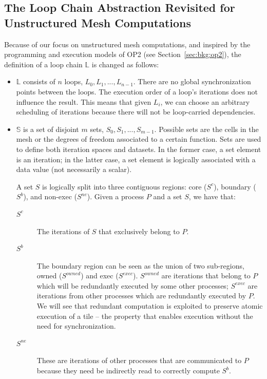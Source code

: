 \subsection{The Loop Chain Abstraction Revisited for Unstructured Mesh Computations}
\label{sec:tiling:lc-unstruct}
Because of our focus on unstructured mesh computations, and inspired by the programming and execution models of OP2 (see Section~\ref{sec:bkg:op2}), the definition of a loop chain $\mathbb{L}$ is changed as follows:
\begin{itemize}
\item $\mathbb{L}$ consists of $n$ loops, $L_0, L_1, ..., L_{n-1}$. There are no global synchronization points between the loops. The execution order of a loop's iterations does not influence the result. This means that given $L_i$, we can choose an arbitrary scheduling of iterations because there will not be loop-carried dependencies. 

\item $\mathbb{S}$ is a set of disjoint $m$ sets, $S_0, S_1, ..., S_{m-1}$. Possible sets are the cells in the mesh or the degrees of freedom associated to a certain function. Sets are used to define both iteration spaces and datasets. In the former case, a set element is an iteration; in the latter case, a set element is logically associated with a data value (not necessarily a scalar). 

A set $S$ is logically split into three contiguous regions: core ($S^{c}$), boundary ($S^{b}$), and non-exec ($S^{ne}$). Given a process $P$ and a set $S$, we have that:
\begin{description}
 \item[$S^{c}$] The iterations of $S$ that exclusively belong to $P$.
 \item[$S^{b}$] The boundary region can be seen as the union of two sub-regions, owned ($S^{owned}$) and exec ($S^{exec}$). $S^{owned}$ are iterations that belong to $P$ which will be redundantly executed by some other processes; $S^{exec}$ are iterations from other processes which are redundantly executed by $P$. We will see that redundant computation is exploited to preserve atomic execution of a tile -- the property that enables execution without the need for synchronization.
  \item[$S^{ne}$] These are iterations of other processes that are communicated to $P$ because they need be indirectly read to correctly compute $S^{b}$.
 \end{description} 
 

\end{itemize}
